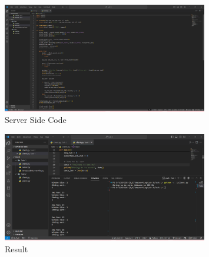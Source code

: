 \documentclass[11pt]{article}
\begin{document}
\begin{itemize}
    \begin{figure}[H]
        \centering
        \includegraphics[width=0.8\textwidth]{Task-1-Server.png}
        \caption{Server Side Code}
        \label{fig:2}
    \end{figure}
    \begin{figure}[H]
        \centering
        \includegraphics[width=0.8\textwidth]{Lab-5-Task-1.png}
        \caption{Result}
        \label{fig:2}
    \end{figure}
    
    

\end{itemize}

 
\end{document}
